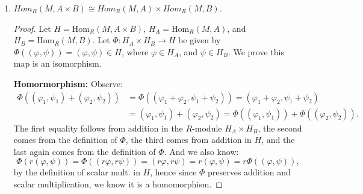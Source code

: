 \documentclass[12pt]{amsbook}
\theoremstyle{plain}
\numberwithin{section}{chapter}
\numberwithin{equation}{chapter}
\theoremstyle{definition}
\theoremstyle{remark}
\renewcommand{\phi}{\varphi}
\begin{document}
\begin{enumerate}[label=\arabic*.]
\begin{enumerate}
\begin{proof}
In the above expression, the first equality comes from the definition of addition in $H_A \times H_B$. The second and third equalities comes from the definition of $\Phi$. And we also know: 
$$
\Phi(r(\phi,\psi)) = \Phi((r\phi,r\psi)) = r\phi + r\psi = r(\phi + \psi) = r\Phi((\phi,\psi)),
$$
hence $\Phi$ preserves mult. by $R$, by the definition of scalar multiplication on the $R$-module $H_A \times H_B$, and the definition of $\Phi$. 

\textbf{Surjectivity: } Let $\phi \in H$. Then $\phi:A\times B \to M$. So let $\phi \in H_A$ be given by $\phi(a) = \phi(a,0)$,
and let $\psi \in H_B$ be given by $\phi(b) = \phi(0,b)$. Then we have: $\Phi((\phi,\psi)) = \phi$.  Then $\Phi$ is surjective. 


\textbf{Injectivity: } Let $\Phi((\phi_1,\psi_1)) = \phi_1 + \psi_1 = \phi_2 + \psi_2 = \Phi((\phi_2,\psi_2)) \in H_A \times H_B$. Then note that 
$$
(\phi_1 + \psi_1)(a,0) = \phi_1(a) = \phi_2(a) = (\phi_2 + \psi_2)(a,0),
$$
and the same holds when we let $a = 0$, and use an arbitrary $b$ value, so we get that $\psi_1 = \psi_2$ as well. Hence $\Phi$ is injective. And thus it is an isomorphism. 
\end{proof}
\item \textit{$Hom_R (M,A \times B) \cong Hom_R(M,A) \times Hom_R(M,B)$.}
\begin{proof}
Let $H = \text{Hom}_R(M, A\times B)$, $H_A = \text{Hom}_R(M,A)$, and $H_B = \text{Hom}_R(M,B)$. Let $\Phi:H_A \times H_B \to H$ be given by $\Phi((\phi,\psi)) = (\phi,\psi) \in H$, where $\phi \in H_A$, and $\psi \in H_B$. We prove this map is an isomorphism. 

\textbf{Homormorphism: }Observe: 
\begin{equation}
\begin{aligned}
\Phi((\phi_1,\psi_1) + (\phi_2,\psi_2)) &= \Phi((\phi_1 + \phi_2,\psi_1 + \psi_2)) = (\phi_1 + \phi_2,\psi_1 + \psi_2)\\ &=(\phi_1,\psi_1) + (\phi_2,\psi_2) =  \Phi((\phi_1,\psi_1)) + \Phi((\phi_2,\psi_2)).
\end{aligned}
\end{equation}
The first equality follows from addition in the $R$-module $H_A \times H_B$, the second comes from the definition of $\Phi$, the third comes from addition in $H$, and the last again comes from the definition of $\Phi$.  And we also know: 
$$
\Phi(r(\phi,\psi)) = \Phi((r\phi,r\psi)) = (r\phi,r\psi) = r(\phi , \psi) = r\Phi((\phi,\psi)),
$$
by the definition of scalar mult. in $H$, hence since $\Phi$ preserves addition and scalar multiplication, we know it is a homomorphism. 


\end{proof}
\end{enumerate}
\end{enumerate}
\end{document}
